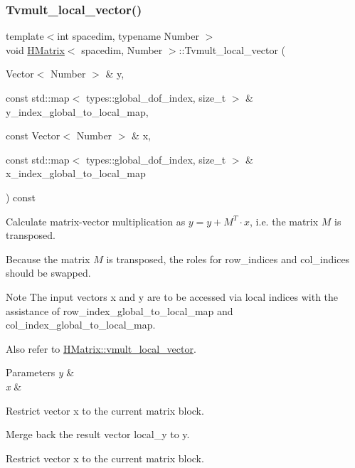 \subsubsection{\texorpdfstring{Tvmult\+\_\+local\+\_\+vector()}{Tvmult\_local\_vector()}}
{\footnotesize\ttfamily template$<$int spacedim, typename Number $>$ \\
void \hyperlink{classHMatrix}{H\+Matrix}$<$ spacedim, Number $>$\+::Tvmult\+\_\+local\+\_\+vector (\begin{DoxyParamCaption}\item[{Vector$<$ Number $>$ \&}]{y,  }\item[{const std\+::map$<$ types\+::global\+\_\+dof\+\_\+index, size\+\_\+t $>$ \&}]{y\+\_\+index\+\_\+global\+\_\+to\+\_\+local\+\_\+map,  }\item[{const Vector$<$ Number $>$ \&}]{x,  }\item[{const std\+::map$<$ types\+::global\+\_\+dof\+\_\+index, size\+\_\+t $>$ \&}]{x\+\_\+index\+\_\+global\+\_\+to\+\_\+local\+\_\+map }\end{DoxyParamCaption}) const}

Calculate matrix-\/vector multiplication as $y = y + M^T \cdot x$, i.\+e. the matrix $M$ is transposed.

Because the matrix $M$ is transposed, the roles for {\ttfamily row\+\_\+indices} and {\ttfamily col\+\_\+indices} should be swapped.


\begin{DoxyDescription}
\item[Note ]The input vectors {\ttfamily x} and {\ttfamily y} are to be accessed via local indices with the assistance of {\ttfamily row\+\_\+index\+\_\+global\+\_\+to\+\_\+local\+\_\+map} and {\ttfamily col\+\_\+index\+\_\+global\+\_\+to\+\_\+local\+\_\+map}. 
\end{DoxyDescription}

Also refer to \hyperlink{classHMatrix_a2afddab534366617b6be203b3c5238a6}{H\+Matrix\+::vmult\+\_\+local\+\_\+vector}. 
\begin{DoxyParams}{Parameters}
{\em y} & \\
\hline
{\em x} & \\
\hline
\end{DoxyParams}
Restrict vector x to the current matrix block.

Merge back the result vector {\ttfamily local\+\_\+y} to {\ttfamily y}.

Restrict vector x to the current matrix block.

